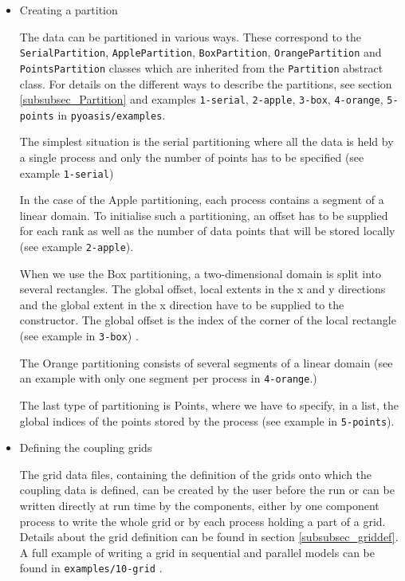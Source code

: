 \begin{itemize}
Also, the current OASIS3-MCT internal debug level ({\tt \$NLOGPRT}
value in the {\it namcouple}), can be retrieved as a property of a component,
namely {\tt debug\_level}, and can be changed by directly modifying this property,
as in {\tt pyoasis/examples/7-multiple-puts/python}.

\item{Creating a partition}
\label{{index:creating-a-partition}}

The data can be partitioned in various ways.
These correspond to the  {\tt SerialPartition}, {\tt ApplePartition},
{\tt BoxPartition}, {\tt OrangePartition} and {\tt PointsPartition}
classes which are inherited from the {\tt Partition} abstract class.
For details on the different ways to describe the partitions,
see section \ref{subsubsec_Partition} and examples {\tt 1-serial},
{\tt 2-apple}, {\tt 3-box}, {\tt 4-orange}, {\tt 5-points} in {\tt pyoasis/examples}.

The simplest situation is the serial partitioning where all the data is
held by a single process and only the number of points has to be
specified (see example {\tt 1-serial})

In the case of the Apple partitioning, each process contains a segment
of a linear domain. To initialise such a partitioning, an offset has to
be supplied for each rank as well as the number of data points that
will be stored locally (see example  {\tt 2-apple}).

When we use the Box partitioning, a two-dimensional domain is split
into several rectangles. The global offset, local extents in the x and
y directions and the global extent in the x direction have to be supplied
to the constructor. The global offset is the index of the corner of the local
rectangle (see example in {\tt 3-box}) .

The Orange partitioning consists of several segments of a linear domain (see an example with only one segment per process in  {\tt 4-orange}.)

The last type of partitioning is Points, where we have to
specify, in a list, the global indices of the points stored by the
process (see example in {\tt 5-points}).

\item{Defining the coupling grids}
\label{index:defining-the-coupling-grids}

The grid data files, containing the definition of the grids onto which
the coupling data is defined, can be created by the user before the
run or can be written directly at run time by the components, either
by one component process to write the whole grid or by each process
holding a part of a grid. Details
about the grid definition can be found in section \ref{subsubsec_griddef}. A full example of writing a grid in sequential and
parallel models can be found in {\tt examples/10-grid} .


\end{itemize}
